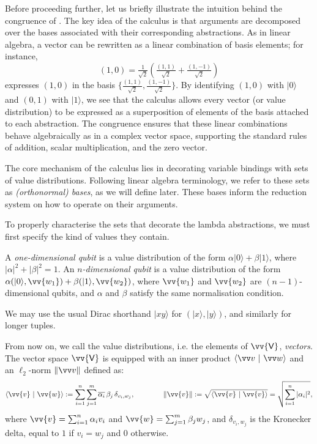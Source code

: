 \documentclass[runningheads,orivec,envcountsame,envcountsect]{llncs}
\newcommand\ket[1]{\ensuremath{|#1\rangle}}
\DeclareRobustCommand{\ValD}{\ensuremath{\vv{\mathsf{V}}}}
\def\scal#1#2{\langle{#1}~|~{#2}\rangle}
\def\Pair#1#2{(#1,#2)} %
\begin{document}
Before proceeding further, let us briefly illustrate the intuition behind
the congruence of .
The key idea of the calculus is that arguments are decomposed over the bases
associated with their corresponding abstractions.
As in linear algebra, a vector can be rewritten as a linear combination of
basis elements; for instance,
\[
  (1,0)
  = \tfrac{1}{\sqrt{2}}\!\left(\tfrac{(1,1)}{\sqrt{2}}
  + \tfrac{(1,-1)}{\sqrt{2}}\right)
\]
expresses $(1,0)$ in the basis
$\{\tfrac{(1,1)}{\sqrt{2}}, \tfrac{(1,-1)}{\sqrt{2}}\}$.
By identifying $(1,0)$ with $\ket{0}$ and $(0,1)$ with $\ket{1}$, we see
that the calculus allows every vector (or value distribution)
to be expressed as a superposition of elements of the basis attached to
each abstraction.
The congruence ensures that these linear combinations behave
algebraically as in a complex vector space, supporting the standard
rules of addition, scalar multiplication, and the zero vector.



The core mechanism of the calculus lies in decorating variable bindings with
sets of value distributions. Following linear algebra terminology, we refer to
these sets as \emph{(orthonormal) bases}, as we will define later. These bases
inform the reduction system on how to operate on their arguments.

To properly characterise the sets that decorate the lambda abstractions, we
must first specify the kind of values they contain.
\begin{definition}[Qubits]\label{def:Qubit}
  A \emph{one-dimensional qubit} is a value distribution of the form
  $\alpha\ket{0} + \beta\ket{1}$, where $|\alpha|^2 + |\beta|^2 = 1$. An
  \emph{$n$-dimensional qubit} is a value distribution of the form
  $\alpha\Pair{\ket{0}}{\vv{w_1}} + \beta\Pair{\ket{1}}{\vv{w_2}}$, where
  $\vv{w_1}$ and $\vv{w_2}$ are $(n-1)$-dimensional qubits, and $\alpha$ and
  $\beta$ satisfy the same normalisation condition.
\end{definition}
We may use the usual Dirac shorthand $\ket{xy}$ for $(\ket{x},\ket{y})$, and
similarly for longer tuples.

From now on, we call the value distributions, i.e. the elements of $\ValD$,
\emph{vectors}. The vector space $\ValD$ is equipped with an inner
product $\scal{\vv v}{\vv w}$ and an $\ell_2$-norm $\|\vv v\|$ defined as:
\[
  \scal{\vv{v}}{\vv{w}} := \sum_{i=1}^n\sum_{j=1}^m
  \overline{\alpha_i}\,\beta_j\,\delta_{v_i,w_j},
  \qquad\qquad
  \|\vv{v}\| := \sqrt{\scal{\vv{v}}{\vv{v}}}
  = \sqrt{\sum_{i=1}^n|\alpha_i|^2},
\]
where $\vv{v}=\sum_{i=1}^n\alpha_i v_i$ and
$\vv{w}=\sum_{j=1}^m\beta_j w_j$, and $\delta_{v_i,w_j}$ is the Kronecker
delta, equal to $1$ if $v_i=w_j$ and $0$ otherwise.
\end{document}
